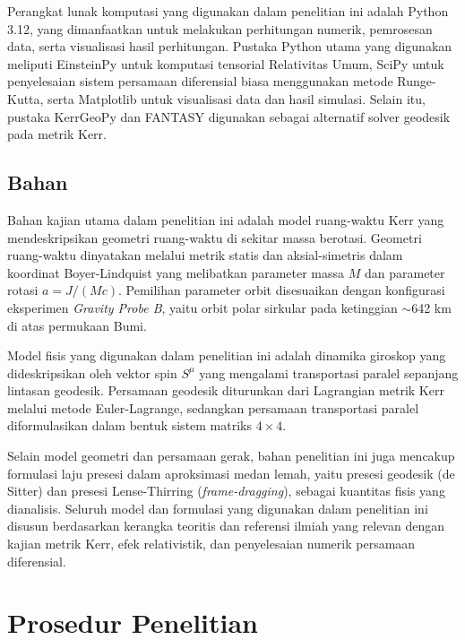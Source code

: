 Perangkat lunak komputasi yang digunakan dalam penelitian ini adalah Python 3.12, yang dimanfaatkan untuk melakukan perhitungan numerik, pemrosesan data, serta visualisasi hasil perhitungan. Pustaka Python utama yang digunakan meliputi EinsteinPy untuk komputasi tensorial Relativitas Umum, SciPy untuk penyelesaian sistem persamaan diferensial biasa menggunakan metode Runge-Kutta, serta Matplotlib untuk visualisasi data dan hasil simulasi. Selain itu, pustaka KerrGeoPy dan FANTASY digunakan sebagai alternatif solver geodesik pada metrik Kerr.

\subsection{Bahan}
\label{subsec:bahan}

Bahan kajian utama dalam penelitian ini adalah model ruang-waktu Kerr yang mendeskripsikan geometri ruang-waktu di sekitar massa berotasi. Geometri ruang-waktu dinyatakan melalui metrik statis dan aksial-simetris dalam koordinat Boyer-Lindquist yang melibatkan parameter massa $M$ dan parameter rotasi $a = J/(Mc)$. Pemilihan parameter orbit disesuaikan dengan konfigurasi eksperimen \textit{Gravity Probe B}, yaitu orbit polar sirkular pada ketinggian $\sim$642 km di atas permukaan Bumi.

Model fisis yang digunakan dalam penelitian ini adalah dinamika giroskop yang dideskripsikan oleh vektor spin $S^\mu$ yang mengalami transportasi paralel sepanjang lintasan geodesik. Persamaan geodesik diturunkan dari Lagrangian metrik Kerr melalui metode Euler-Lagrange, sedangkan persamaan transportasi paralel diformulasikan dalam bentuk sistem matriks $4 \times 4$.

Selain model geometri dan persamaan gerak, bahan penelitian ini juga mencakup formulasi laju presesi dalam aproksimasi medan lemah, yaitu presesi geodesik (de Sitter) dan presesi Lense-Thirring (\textit{frame-dragging}), sebagai kuantitas fisis yang dianalisis. Seluruh model dan formulasi yang digunakan dalam penelitian ini disusun berdasarkan kerangka teoritis dan referensi ilmiah yang relevan dengan kajian metrik Kerr, efek relativistik, dan penyelesaian numerik persamaan diferensial.

\section{Prosedur Penelitian}
\label{sec:prosedur}


